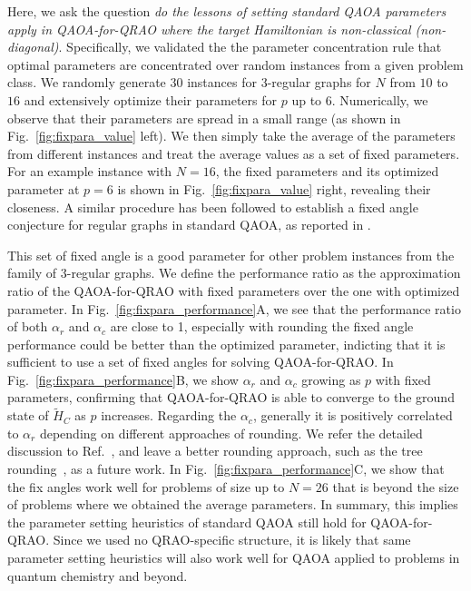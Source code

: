 \documentclass[conference,10pt]{IEEEtran}
\newcommand{\QAOAQRAO}{QAOA-for-QRAO}
\begin{document}
Here, we ask the question \emph{do the lessons of setting standard QAOA parameters apply in \QAOAQRAO{} where the target Hamiltonian is non-classical (non-diagonal)}. Specifically, we validated the the parameter concentration rule that optimal parameters are concentrated over random instances from a given problem class. We randomly generate $30$ instances for 3-regular graphs for $N$ from $10$ to $16$ and extensively optimize their parameters for $p$ up to $6$. 
Numerically, we observe that their parameters are spread in a small range (as shown in Fig.~\ref{fig:fixpara_value} left). We then simply take the average of the parameters from different instances and treat the average values as a set of fixed parameters.
For an example instance with $N=16$, the fixed parameters and its optimized parameter at $p=6$ is shown in Fig.~\ref{fig:fixpara_value} right, revealing their closeness. A similar procedure has been followed to establish a fixed angle conjecture for regular graphs in standard QAOA, as reported in \cite{wurtz2021fixed}.

This set of fixed angle is a good parameter for other problem instances from the family of $3$-regular graphs.  We define the performance ratio as the approximation ratio of the \QAOAQRAO{} with fixed parameters over the one with optimized parameter. In Fig.~\ref{fig:fixpara_performance}A, we see that the performance ratio of both $\alpha_r$ and $\alpha_c$ are close to 1, especially with rounding the fixed angle performance could be better than the optimized parameter, indicting that it is sufficient to use a set of fixed angles for solving \QAOAQRAO{}.  In Fig.~\ref{fig:fixpara_performance}B, we show $\alpha_r$ and $\alpha_c$ growing as $p$ with fixed parameters, confirming that \QAOAQRAO{} is able to converge to the ground state of $\tilde{H}_C$ as $p$ increases. Regarding the $\alpha_c$, generally it is positively correlated to $\alpha_r$ depending on different approaches of rounding. We refer the detailed discussion to Ref.~\cite{Fulleretal2024,teramoto2023quantumrelaxation}, and leave a better rounding approach, such as the tree rounding~\cite{kondo2024recursive}, as a future work.
In Fig.~\ref{fig:fixpara_performance}C, we show that the fix angles work well for problems of size up to $N=26$ that is beyond the size of problems where we obtained the average parameters. 
In summary, this implies the parameter setting heuristics of standard QAOA still hold for \QAOAQRAO{}. Since we used no QRAO-specific structure, it is likely that same parameter setting heuristics will also work well for QAOA applied to problems in quantum chemistry and beyond.
\end{document}
